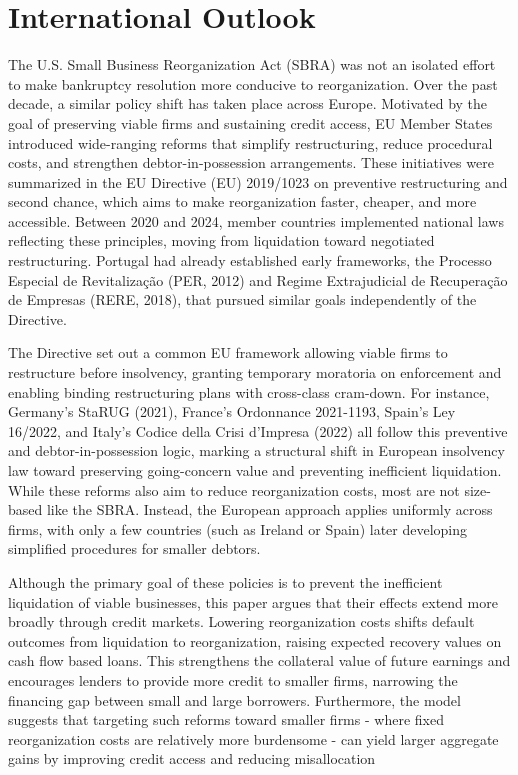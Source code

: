 \documentclass[12pt]{article}
\begin{document}
\section{International Outlook \label{sec:International}}
The U.S. Small Business Reorganization Act (SBRA) was not an isolated effort to make bankruptcy resolution more conducive to reorganization. Over the past decade, a similar policy shift has taken place across Europe. Motivated by the goal of preserving viable firms and sustaining credit access, EU Member States introduced wide-ranging reforms that simplify restructuring, reduce procedural costs, and strengthen debtor-in-possession arrangements. These initiatives were summarized in the EU Directive (EU) 2019/1023 on preventive restructuring and second chance, which aims to make reorganization faster, cheaper, and more accessible. Between 2020 and 2024, member countries implemented national laws reflecting these principles, moving from liquidation toward negotiated restructuring. Portugal had already established early frameworks, the Processo Especial de Revitalização (PER, 2012) and Regime Extrajudicial de Recuperação de Empresas (RERE, 2018), that pursued similar goals independently of the Directive.

The Directive set out a common EU framework allowing viable firms to restructure before insolvency, granting temporary moratoria on enforcement and enabling binding restructuring plans with cross-class cram-down. For instance, Germany's StaRUG (2021), France's Ordonnance 2021-1193, Spain's Ley 16/2022, and Italy's Codice della Crisi d'Impresa (2022) all follow this preventive and debtor-in-possession logic, marking a structural shift in European insolvency law toward preserving going-concern value and preventing inefficient liquidation. While these reforms also aim to reduce reorganization costs, most are not size-based like the SBRA. Instead, the European approach applies uniformly across firms, with only a few countries (such as Ireland or Spain) later developing simplified procedures for smaller debtors.

Although the primary goal of these policies is to prevent the inefficient liquidation of viable businesses, this paper argues that their effects extend more broadly through credit markets. Lowering reorganization costs shifts default outcomes from liquidation to reorganization, raising expected recovery values on cash flow based loans. This strengthens the collateral value of future earnings and encourages lenders to provide more credit to smaller firms, narrowing the financing gap between small and large borrowers. Furthermore, the model suggests that targeting such reforms toward smaller firms - where fixed reorganization costs are relatively more burdensome - can yield larger aggregate gains by improving credit access and reducing misallocation
\end{document}
